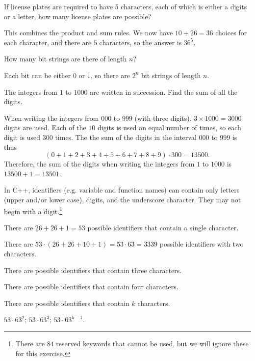 \begin{exer}
If license plates are required to have 5 characters, each of which is
either a digits or a letter,
how many license plates are possible?

\noindent
\answerline
\begin{answer}
This combines the product and sum rules.
We now have $10+26=36$ choices for each character, and there are $5$ characters,
so the answer is $36^5$.
\end{answer}
\end{exer}

\begin{exer}
How many bit strings are there of length $n$?

\noindent
\answerline
\begin{answer}
Each bit can be either $0$ or $1$, so there are $2^n$ bit strings of length $n$.
\end{answer}
\end{exer}

\begin{exa}
The integers from $1$ to $1000$ are written in succession. Find the
sum of all the digits.
\begin{sol} When writing the integers
from $000$ to $999$ (with three digits), $3\times 1000 = 3000$
digits are used. Each of the $10$ digits is used an equal number of
times, so each digit is used $300$ times. The the sum of the digits
in the interval $000$ to $999$ is thus
$$(0 + 1 + 2 + 3+ 4 + 5+ 6+ 7 + 8 + 9)\cdot 300 = 13500.
$$Therefore, the sum of the digits when writing the integers from
$1$ to $1000$ is $13500 + 1 = 13501$.
\end{sol}
\end{exa} 

\begin{fib}
In C++, identifiers (e.g. variable and function names) 
can contain only letters (upper and/or lower case), digits, and
the underscore character.  They may not begin with a digit.\footnote{There are 
$84$ reserved keywords that cannot be used, but we will ignore these for this exercise.}
\begin{lenum}
\item There are $26+26+1=53$ possible identifiers that contain a single character.
\item There are $53\cdot(26+26+10+1)=53\cdot 63 = 3339$ 
possible identifiers with two characters.
\item There are  possible identifiers that contain three characters.
\item There are  possible identifiers that contain four characters.
\item There are  possible identifiers that contain $k$ characters.
\end{lenum}
\begin{answer}
$53\cdot 63^2$;
$53\cdot 63^3$;
$53\cdot 63^{k-1}$.
\end{answer}
\end{fib}

